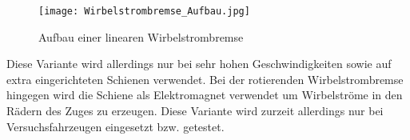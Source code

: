 \begin{figure}
  \centering
  \texttt{[image: Wirbelstrombremse\_Aufbau.jpg]}
  \caption{Aufbau einer linearen Wirbelstrombremse}
  \label{fig:linWAufbau}
\end{figure}

Diese Variante
wird allerdings nur bei sehr hohen Geschwindigkeiten sowie auf extra eingerichteten
Schienen verwendet.
Bei der rotierenden Wirbelstrombremse hingegen wird die Schiene als Elektromagnet
verwendet um Wirbelströme in den Rädern des Zuges zu erzeugen. Diese Variante wird
zurzeit allerdings nur bei Versuchsfahrzeugen eingesetzt bzw. getestet.



